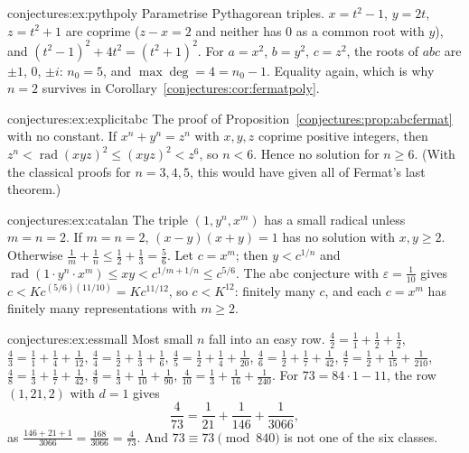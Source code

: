 \begin{solution}{conjectures:ex:pythpoly}
\idea Parametrise Pythagorean triples.
\writeup $x=t^2-1$, $y=2t$, $z=t^2+1$ are coprime ($z-x=2$ and neither has $0$ as a common root with $y$), and
$(t^2-1)^2+4t^2=(t^2+1)^2$. For $a=x^2$, $b=y^2$, $c=z^2$, the roots of $abc$ are $\pm1$, $0$, $\pm i$: $n_0=5$, and $\max\deg=4=n_0-1$. Equality again,
which is why $n=2$ survives in Corollary~\ref{conjectures:cor:fermatpoly}.
\end{solution}

\begin{solution}{conjectures:ex:explicitabc}
\idea The proof of Proposition~\ref{conjectures:prop:abcfermat} with no constant.
\writeup If $x^n+y^n=z^n$ with $x,y,z$ coprime positive integers, then $z^n<\operatorname{rad}(xyz)^2\le(xyz)^2<z^6$, so $n<6$. Hence no solution for
$n\ge6$. (With the classical proofs for $n=3,4,5$, this would have given all of Fermat's last theorem.)
\end{solution}

\begin{solution}{conjectures:ex:catalan}
\idea The triple $(1,y^n,x^m)$ has a small radical unless $m=n=2$.
\writeup If $m=n=2$, $(x-y)(x+y)=1$ has no solution with $x,y\ge2$. Otherwise $\frac1m+\frac1n\le\frac12+\frac13=\frac56$. Let $c=x^m$; then $y<c^{1/n}$ and
$\operatorname{rad}(1\cdot y^n\cdot x^m)\le xy<c^{1/m+1/n}\le c^{5/6}$. The abc conjecture with $\varepsilon=\frac1{10}$ gives $c<Kc^{(5/6)(11/10)}=Kc^{11/12}$,
so $c<K^{12}$: finitely many $c$, and each $c=x^m$ has finitely many representations with $m\ge2$.
\end{solution}

\begin{solution}{conjectures:ex:essmall}
\idea Most small $n$ fall into an easy row.
\writeup $\frac42=\frac11+\frac12+\frac12$, $\frac43=\frac11+\frac14+\frac1{12}$, $\frac44=\frac12+\frac13+\frac16$, $\frac45=\frac12+\frac14+\frac1{20}$,
$\frac46=\frac12+\frac17+\frac1{42}$, $\frac47=\frac12+\frac1{15}+\frac1{210}$, $\frac48=\frac13+\frac17+\frac1{42}$, $\frac49=\frac13+\frac1{10}+\frac1{90}$,
$\frac4{10}=\frac13+\frac1{16}+\frac1{240}$. For $73=84\cdot1-11$, the row $(1,21,2)$ with $d=1$ gives
\[
\frac4{73}=\frac1{21}+\frac1{146}+\frac1{3066},
\]
as $\frac{146+21+1}{3066}=\frac{168}{3066}=\frac4{73}$. And $73\equiv73\pmod{840}$ is not one of the six classes.
\end{solution}

